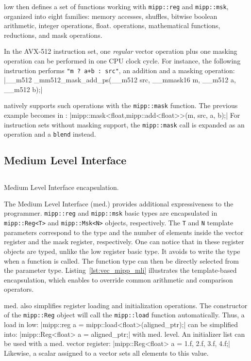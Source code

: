 \MIPP low then defines a set of functions working with \verb|mipp::reg| and
\verb|mipp::msk|, organized into eight families: memory accesses, shuffles,
bitwise boolean arithmetic, integer operations, float. operations, mathematical
functions, reductions, and mask operations.

In the AVX-512 instruction set, one \textit{regular} vector operation plus one
masking operation can be performed in one CPU clock cycle. For instance, the
following instruction performs \verb|"m ? a+b : src"|, an addition and a masking
operation:
|__m512 _mm512_mask_add_ps(__m512 src, __mmask16 m, __m512 a, __m512 b);|

\MIPP natively supports such operations with the \verb|mipp::mask| function. The
previous example becomes in \MIPP:
|mipp::mask<float,mipp::add<float>>(m, src, a, b);|
For instruction sets without masking support, the \verb|mipp::mask| call is
expanded as an operation and a \verb|blend| instead.

\subsection{Medium Level Interface}

\begin{listing}[htp]
  \inputminted[frame=lines,linenos]{C++}{main/chapter3/src/mipp/mli.cpp}
  \caption{Medium Level Interface encapsulation.}
  \label{lst:vec_mipp_mli}
\end{listing}

The \MIPP Medium Level Interface (\MIPP med.) provides additional expressiveness
to the programmer. \verb|mipp::reg| and \verb|mipp::msk| basic types are
encapsulated in \verb|mipp::Reg<T>| and \verb|mipp::Msk<N>| objects,
respectively. The \verb|T| and \verb|N| template parameters correspond to the
type and the number of elements inside the vector register and the mask
register, respectively. One can notice that in these register objects are typed,
unlike the \MIPP low register basic type. It avoids to write the type when a
\MIPP function is called. The function type can then be directly selected from
the parameter type. Listing~\ref{lst:vec_mipp_mli} illustrates the
template-based encapsulation, which enables \MIPP to override common arithmetic
and comparison operators.

\MIPP med. also simplifies register loading and initialization operations. The
constructor of the \verb|mipp::Reg| object will call the \verb|mipp::load|
function automatically. Thus, a load in \MIPP low:
|mipp::reg a = mipp::load<float>(aligned_ptr);|
can be simplified into:
|mipp::Reg<float> a = aligned_ptr;|
with \MIPP med. level. An initializer list
can be used with a \MIPP med. vector register:
|mipp::Reg<float> a = {1.f, 2.f, 3.f, 4.f};|
Likewise, a scalar assigned to a vector sets all elements to
this value.


